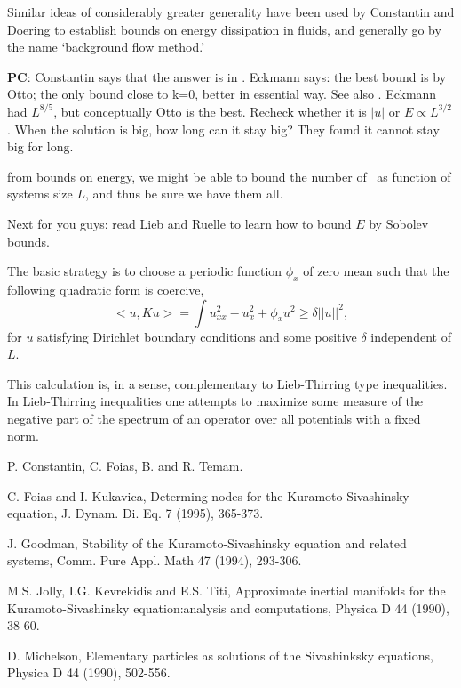 Similar ideas of
considerably greater generality have been used by Constantin and Doering
to establish bounds on energy dissipation in fluids, and generally
go by the name `background flow method.'

%
{\bf PC}:
  Constantin says that the answer is in
    . Eckmann says: the  best bound is by Otto; the
    only bound close to k=0, better in essential way. See also .
    Eckmann had $L^{8/5}$, but conceptually Otto is the best. Recheck whether it is
    $|u|$ or $E \propto L^{3/2}$.
    When the solution is big, how long can it stay big? They found it cannot stay big for
    long.



from bounds on energy, we might be able
to bound the number of \eqva\ as function of systems size $L$, and thus
be sure we have them all.

Next for you guys: read Lieb and Ruelle to learn
    how to bound $E$  by Sobolev bounds.


The basic strategy is to choose a
periodic function $\phi_x$ of zero mean such that the following
quadratic form is coercive,
\[
<\!\!u, K u\!\!>= \int u_{xx}^2 - u_x^2 + \phi_x u^2 \ge \delta |\!|u|\!|^2,
\]
for $u$ satisfying Dirichlet boundary conditions and some positive
$\delta$ independent of $L$.

This calculation is, in a sense, complementary to Lieb-Thirring type
inequalities.
In Lieb-Thirring inequalities one attempts to maximize some measure of the
negative part of the spectrum of an operator over all potentials with
a fixed norm.



P. Constantin, C. Foias, B.  and R.
Temam.

C. Foias and I. Kukavica, Determing nodes for the Kuramoto-Sivashinsky equation, J. Dynam. Di. Eq. 7 (1995), 365-373.

J. Goodman, Stability of the Kuramoto-Sivashinsky equation and related systems, Comm. Pure Appl. Math 47 (1994), 293-306.

M.S. Jolly, I.G. Kevrekidis and E.S. Titi, Approximate inertial manifolds for the Kuramoto-Sivashinsky equation:analysis and computations, Physica D 44 (1990), 38-60.

D. Michelson, Elementary particles as solutions of the Sivashinksky equations, Physica D 44 (1990), 502-556.

